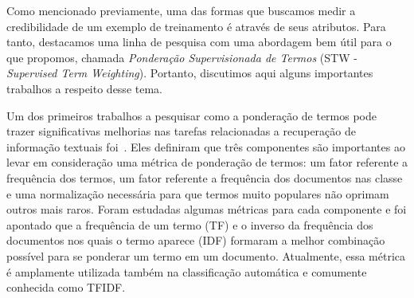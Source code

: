 Como mencionado previamente, uma das formas que buscamos medir a credibilidade de um exemplo de treinamento é através de seus atributos. Para tanto, destacamos uma linha de pesquisa com uma abordagem bem útil para o que propomos, chamada \textit{Ponderação Supervisionada de Termos} (\textsc{STW} - \textit{Supervised Term Weighting}). Portanto, discutimos aqui alguns importantes trabalhos a respeito desse tema.

Um dos primeiros trabalhos a pesquisar como a ponderação de termos pode trazer significativas melhorias nas tarefas relacionadas a recuperação de informação textuais foi~\cite{Salton88}.
Eles definiram que três componentes são importantes ao levar em consideração uma métrica de ponderação de termos: um fator referente a frequência dos termos, um fator referente a frequência dos documentos nas classe e uma normalização necessária para que termos muito populares não oprimam outros mais raros.
Foram estudadas algumas métricas para cada componente e foi apontado que a frequência de um termo (\textsc{TF}) e o inverso da frequência dos documentos nos quais o termo aparece (\textsc{IDF}) formaram a melhor combinação possível para se ponderar um termo em um documento. 
Atualmente, essa métrica é amplamente utilizada também na classificação automática e comumente conhecida como \textsc{TFIDF}.

